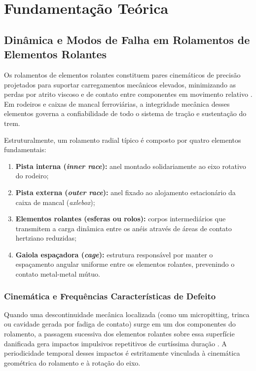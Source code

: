 \chapter{Fundamentação Teórica}
\label{cap:revisao}

\section{Dinâmica e Modos de Falha em Rolamentos de Elementos Rolantes}
\label{sec:dinamica_rolamentos}

Os rolamentos de elementos rolantes constituem pares cinemáticos de precisão projetados para suportar carregamentos mecânicos elevados, minimizando as perdas por atrito viscoso e de contato entre componentes em movimento relativo \cite{harris2006rolling}. Em rodeiros e caixas de mancal ferroviárias, a integridade mecânica desses elementos governa a confiabilidade de todo o sistema de tração e sustentação do trem.

Estruturalmente, um rolamento radial típico é composto por quatro elementos fundamentais:
\begin{enumerate}
    \item \textbf{Pista interna (\textit{inner race}):} anel montado solidariamente ao eixo rotativo do rodeiro;
    \item \textbf{Pista externa (\textit{outer race}):} anel fixado ao alojamento estacionário da caixa de mancal (\textit{axlebox});
    \item \textbf{Elementos rolantes (esferas ou rolos):} corpos intermediários que transmitem a carga dinâmica entre os anéis através de áreas de contato hertziano reduzidas;
    \item \textbf{Gaiola espaçadora (\textit{cage}):} estrutura responsável por manter o espaçamento angular uniforme entre os elementos rolantes, prevenindo o contato metal-metal mútuo.
\end{enumerate}

\subsection{Cinemática e Frequências Características de Defeito}
\label{subsec:frequencias_falha}

Quando uma descontinuidade mecânica localizada (como um micropitting, trinca ou cavidade gerada por fadiga de contato) surge em um dos componentes do rolamento, a passagem sucessiva dos elementos rolantes sobre essa superfície danificada gera impactos impulsivos repetitivos de curtíssima duração \cite{randall2011rolling}. A periodicidade temporal desses impactos é estritamente vinculada à cinemática geométrica do rolamento e à rotação do eixo.

